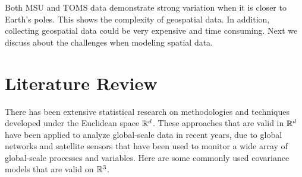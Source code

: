 Both MSU and TOMS data demonstrate strong variation when it is closer to Earth's poles. This shows the complexity of geospatial data. In addition, collecting geospatial data could be very expensive and time consuming. Next we discuss about the challenges when modeling spatial data.






\section{Literature Review}

There has been extensive statistical research on methodologies and techniques developed under the Euclidean space $\mathbb{R}^d$. These approaches that are valid in $\mathbb{R}^d$ have been applied to analyze global-scale data in recent years, due to global networks and satellite sensors that have been used to monitor a wide array of global-scale processes and variables. Here are some commonly used covariance models that are valid on $\mathbb{R}^3$.

